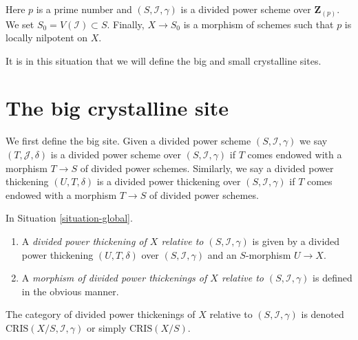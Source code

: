 \begin{situation}
\label{situation-global}
Here $p$ is a prime number and $(S, \mathcal{I}, \gamma)$ is a divided power
scheme over $\mathbf{Z}_{(p)}$. We set $S_0 = V(\mathcal{I}) \subset S$.
Finally, $X \to S_0$ is a morphism of schemes such that $p$ is
locally nilpotent on $X$.
\end{situation}

\noindent
It is in this situation that we will define the big and small
crystalline sites.









\section{The big crystalline site}
\label{section-big-site}

\noindent
We first define the big site. Given a divided power scheme
$(S, \mathcal{I}, \gamma)$ we say $(T, \mathcal{J}, \delta)$ is
a divided power scheme over $(S, \mathcal{I}, \gamma)$ if
$T$ comes endowed with a morphism $T \to S$ of divided power
schemes. Similarly, we say a divided power thickening $(U, T, \delta)$
is a divided power thickening over $(S, \mathcal{I}, \gamma)$
if $T$ comes endowed with a morphism $T \to S$ of divided power
schemes.

\begin{definition}
\label{definition-divided-power-thickening-X}
In Situation \ref{situation-global}.
\begin{enumerate}
\item A {\it divided power thickening of $X$ relative to
$(S, \mathcal{I}, \gamma)$} is given by a divided power thickening
$(U, T, \delta)$ over $(S, \mathcal{I}, \gamma)$
and an $S$-morphism $U \to X$.
\item A {\it morphism of divided power thickenings of $X$
relative to $(S, \mathcal{I}, \gamma)$} is defined in the obvious
manner.
\end{enumerate}
The category of divided power thickenings of $X$ relative to
$(S, \mathcal{I}, \gamma)$ is denoted $\text{CRIS}(X/S, \mathcal{I}, \gamma)$
or simply $\text{CRIS}(X/S)$.
\end{definition}

